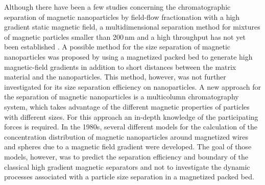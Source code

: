 
Although there have been a few studies concerning the chromatographic separation of magnetic nanoparticles by field-flow fractionation with a high gradient static magnetic field, a multidimensional separation method for mixtures of magnetic particles smaller than 200\,nm and a high throughput has not yet been established \cite{kim2007development,williams2009magnetic,williams2010characterization}. A possible method for the size separation of magnetic nanoparticles was proposed by \cite{nomizu1996magnetic} using a magnetized packed bed to generate high magnetic-field gradients in addition to short distances between the matrix material and the nanoparticles. This method, however, was not further investigated for its size separation efficiency on nanoparticles. A new approach for the separation of magnetic nanoparticles is a multicolumn chromatography system, which takes advantage of the different magnetic properties of particles with different sizes. For this approach an in-depth knowledge of the participating forces is required.    
In the 1980s, several different models for the calculation of the concentration distribution of magnetic nanoparticles around magnetized wires \cite{gerber1984magnetic,davies19902,fletcher1991fine} and spheres \cite{moyer1986filtration} due to a magnetic field gradient were developed. The goal of those models, however, was to predict the separation efficiency and boundary of the classical high gradient magnetic separators and not to investigate the dynamic processes associated with a particle size separation in a magnetized packed bed.

